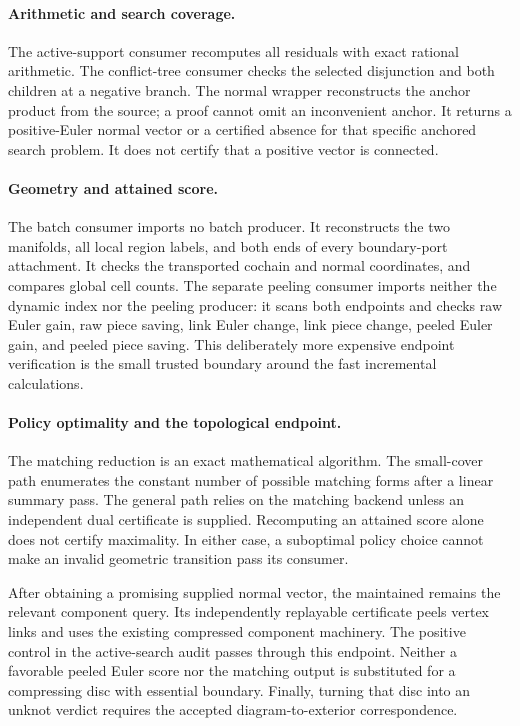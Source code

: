 \paragraph{Arithmetic and search coverage.}
The active-support consumer recomputes all residuals with exact rational
arithmetic. The conflict-tree consumer checks the selected disjunction and
both children at a negative branch. The normal wrapper reconstructs the
anchor product from the source; a proof cannot omit an inconvenient anchor.
It returns a positive-Euler normal vector or a certified absence for that
specific anchored search problem. It does not certify that a positive
vector is connected.

\paragraph{Geometry and attained score.}
The batch consumer imports no batch producer. It reconstructs the two
manifolds, all local region labels, and both ends of every boundary-port
attachment. It checks the transported cochain and normal coordinates, and
compares global cell counts. The separate peeling consumer imports neither
the dynamic index nor the peeling producer: it scans both endpoints and
checks raw Euler gain, raw piece saving, link Euler change, link piece
change, peeled Euler gain, and peeled piece saving. This deliberately more
expensive endpoint verification is the small trusted boundary around the
fast incremental calculations.

\paragraph{Policy optimality and the topological endpoint.}
The matching reduction is an exact mathematical algorithm. The small-cover
path enumerates the constant number of possible matching forms after a
linear summary pass. The general path relies on the matching backend unless
an independent dual certificate is supplied. Recomputing an attained score
alone does not certify maximality. In either case, a suboptimal policy choice
cannot make an invalid geometric transition pass its consumer.

After obtaining a promising supplied normal vector, the maintained
 remains the relevant component
query. Its independently replayable certificate peels vertex links and
uses the existing compressed component machinery. The positive control in
the active-search audit passes through this endpoint. Neither a favorable
peeled Euler score nor the matching output is substituted for a compressing
disc with essential boundary. Finally, turning that disc into an unknot
verdict requires the accepted diagram-to-exterior correspondence.


